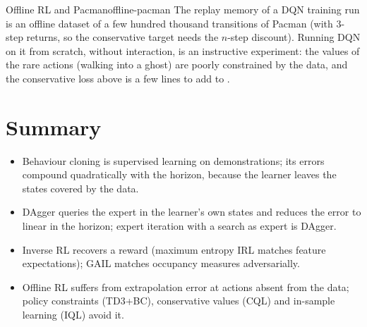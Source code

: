 \begin{remark}{Offline RL and Pacman}{offline-pacman}
  The replay memory of a DQN training run is an offline dataset of a few
  hundred thousand transitions of Pacman (with $3$-step returns, so the
  conservative target needs the $n$-step discount). Running DQN on it from
  scratch, without interaction, is an instructive experiment: the values of the
  rare
  actions (walking into a ghost) are poorly constrained by the data, and
  the conservative loss above is a few lines to add to .
\end{remark}

\section{Summary}

\begin{itemize}[nosep]
  \item Behaviour cloning is supervised learning on demonstrations; its
    errors compound quadratically with the horizon, because the learner
    leaves the states covered by the data.
  \item DAgger queries the expert in the learner's own states and reduces
    the error to linear in the horizon; expert iteration with a search as
    expert is DAgger.
  \item Inverse RL recovers a reward (maximum entropy IRL matches feature
    expectations); GAIL matches occupancy measures adversarially.
  \item Offline RL suffers from extrapolation error at actions absent from
    the data; policy constraints (TD3+BC), conservative values (CQL) and
    in-sample learning (IQL) avoid it.
\end{itemize}
